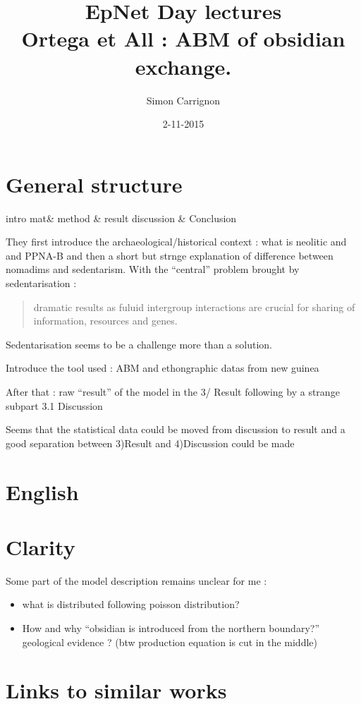 \documentclass[a4paper]{article}
\title{EpNet Day lectures\\
Ortega et All : ABM of obsidian exchange.
}
\author{Simon Carrignon}
\date{2-11-2015}
\begin{document}
\maketitle

\section{General structure}
intro mat\& method \& result discussion \& Conclusion

They first introduce the archaeological/historical context : what is neolitic and and PPNA-B and then a short but strnge explanation of difference between nomadims and sedentarism. With the ``central'' problem brought by sedentarisation : 
\begin{quote}
    dramatic results as fuluid intergroup interactions are crucial for sharing of information, resources and genes.
\end{quote}

Sedentarisation seems to be a challenge more than a solution.

Introduce the tool used : ABM and ethongraphic datas from new guinea

After that : raw ``result'' of the model in the 3/ Result following by a strange subpart 3.1 Discussion

Seems that the statistical data could be moved from discussion to result and a good separation between 3)Result and 4)Discussion could be made
\section{English}

\section{Clarity}

Some part of the model description remains unclear for me : 

\begin{itemize}
    \item what is distributed following poisson distribution? 
    \item How and why ``obsidian is introduced from the northern boundary?''  geological evidence ? (btw production equation is cut in the middle)
\end{itemize}

\section{Links to similar works}
\end{document}
